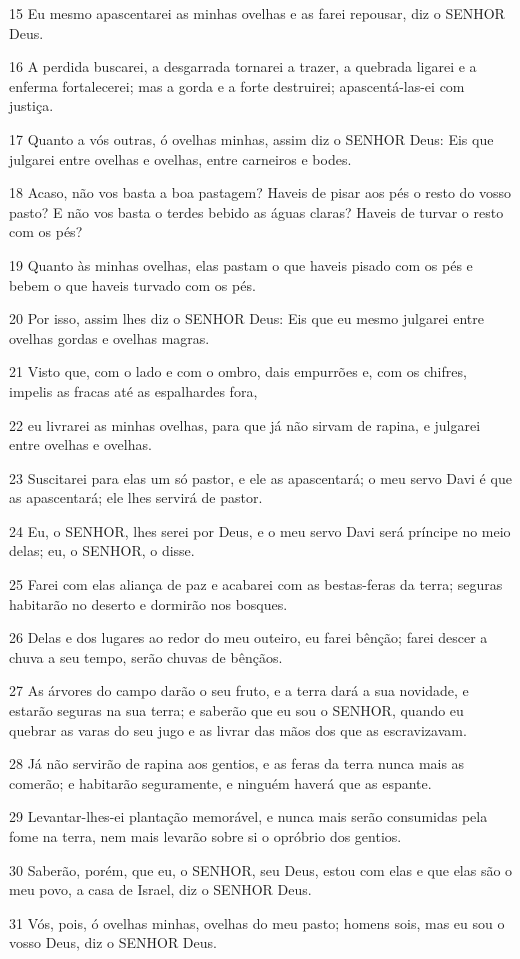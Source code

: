 \par 15 Eu mesmo apascentarei as minhas ovelhas e as farei repousar, diz o SENHOR Deus.
\par 16 A perdida buscarei, a desgarrada tornarei a trazer, a quebrada ligarei e a enferma fortalecerei; mas a gorda e a forte destruirei; apascentá-las-ei com justiça.
\par 17 Quanto a vós outras, ó ovelhas minhas, assim diz o SENHOR Deus: Eis que julgarei entre ovelhas e ovelhas, entre carneiros e bodes.
\par 18 Acaso, não vos basta a boa pastagem? Haveis de pisar aos pés o resto do vosso pasto? E não vos basta o terdes bebido as águas claras? Haveis de turvar o resto com os pés?
\par 19 Quanto às minhas ovelhas, elas pastam o que haveis pisado com os pés e bebem o que haveis turvado com os pés.
\par 20 Por isso, assim lhes diz o SENHOR Deus: Eis que eu mesmo julgarei entre ovelhas gordas e ovelhas magras.
\par 21 Visto que, com o lado e com o ombro, dais empurrões e, com os chifres, impelis as fracas até as espalhardes fora,
\par 22 eu livrarei as minhas ovelhas, para que já não sirvam de rapina, e julgarei entre ovelhas e ovelhas.
\par 23 Suscitarei para elas um só pastor, e ele as apascentará; o meu servo Davi é que as apascentará; ele lhes servirá de pastor.
\par 24 Eu, o SENHOR, lhes serei por Deus, e o meu servo Davi será príncipe no meio delas; eu, o SENHOR, o disse.
\par 25 Farei com elas aliança de paz e acabarei com as bestas-feras da terra; seguras habitarão no deserto e dormirão nos bosques.
\par 26 Delas e dos lugares ao redor do meu outeiro, eu farei bênção; farei descer a chuva a seu tempo, serão chuvas de bênçãos.
\par 27 As árvores do campo darão o seu fruto, e a terra dará a sua novidade, e estarão seguras na sua terra; e saberão que eu sou o SENHOR, quando eu quebrar as varas do seu jugo e as livrar das mãos dos que as escravizavam.
\par 28 Já não servirão de rapina aos gentios, e as feras da terra nunca mais as comerão; e habitarão seguramente, e ninguém haverá que as espante.
\par 29 Levantar-lhes-ei plantação memorável, e nunca mais serão consumidas pela fome na terra, nem mais levarão sobre si o opróbrio dos gentios.
\par 30 Saberão, porém, que eu, o SENHOR, seu Deus, estou com elas e que elas são o meu povo, a casa de Israel, diz o SENHOR Deus.
\par 31 Vós, pois, ó ovelhas minhas, ovelhas do meu pasto; homens sois, mas eu sou o vosso Deus, diz o SENHOR Deus.

